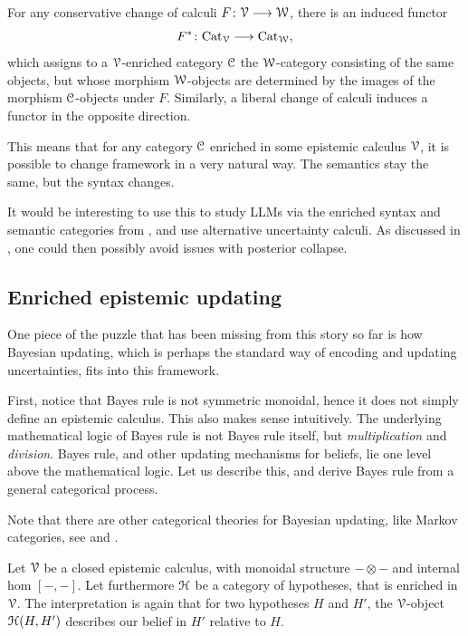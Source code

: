 \begin{theorem}
    For any conservative change of calculi $F\colon\EuScript{V} \longrightarrow \EuScript{W}$, there is an induced functor 
    \[F^*\colon\mathrm{Cat}_{\EuScript{V}} \longrightarrow \mathrm{Cat}_{\EuScript{W}},\]
    which assigns to a $\EuScript{V}$-enriched category $\EuScript{C}$ the $\EuScript{W}$-category consisting of the same objects, but whose morphism $\EuScript{W}$-objects are determined by the images of the morphism $\EuScript{C}$-objects under $F$. Similarly, a liberal change of calculi induces a functor in the opposite direction. 
\end{theorem}

This means that for any category $\EuScript{C}$ enriched in some epistemic calculus $\EuScript{V}$, it is possible to change framework in a very natural way. The semantics stay the same, but the syntax changes. 

\begin{remark}
    It would be interesting to use this to study LLMs via the enriched syntax and semantic categories from \cite{bradley-terilla-vlassopoulos_2022}, and use alternative uncertainty calculi. As discussed in \cite{opdan_2025}, one could then possibly avoid issues with posterior collapse. 
\end{remark}






\subsection{Enriched epistemic updating}
\label{sses:updating}
One piece of the puzzle that has been missing from this story so far is how Bayesian updating, which is perhaps the standard way of encoding and updating uncertainties, fits into this framework. 

First, notice that Bayes rule is not symmetric monoidal, hence it does not simply define an epistemic calculus. This also makes sense intuitively. The underlying mathematical logic of Bayes rule is not Bayes rule itself, but \emph{multiplication} and \emph{division}. Bayes rule, and other updating mechanisms for beliefs, lie one level above the mathematical logic. Let us describe this, and derive Bayes rule from a general categorical process. 

\begin{remark}
    Note that there are other categorical theories for Bayesian updating, like Markov categories, see \cite{fritz_2020} and \cite{cho-jacobs_2019}. 
\end{remark}

Let $\EuScript{V}$ be a closed epistemic calculus, with monoidal structure $-\otimes -$ and internal hom $[-,-]$. Let furthermore $\EuScript{H}$ be a category of hypotheses, that is enriched in $\EuScript{V}$. The interpretation is again that for two hypotheses $H$ and $H'$, the $\EuScript{V}$-object $\EuScript{H}(H,H')$ describes our belief in $H'$ relative to $H$. 

